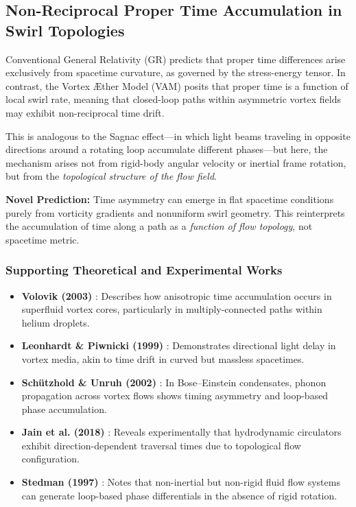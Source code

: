 \subsection{Non-Reciprocal Proper Time Accumulation in Swirl Topologies}

Conventional General Relativity (GR) predicts that proper time differences arise exclusively from spacetime curvature, as governed by the stress-energy tensor. In contrast, the Vortex Æther Model (VAM) posits that proper time is a function of local swirl rate, meaning that closed-loop paths within asymmetric vortex fields may exhibit non-reciprocal time drift.

This is analogous to the Sagnac effect---in which light beams traveling in opposite directions around a rotating loop accumulate different phases---but here, the mechanism arises not from rigid-body angular velocity or inertial frame rotation, but from the \emph{topological structure of the flow field}.

\textbf{Novel Prediction:} Time asymmetry can emerge in flat spacetime conditions purely from vorticity gradients and nonuniform swirl geometry. This reinterprets the accumulation of time along a path as a \emph{function of flow topology}, not spacetime metric.

\subsubsection{Supporting Theoretical and Experimental Works}

\begin{itemize}
    \item \textbf{Volovik (2003)} \cite{volovik2003}: Describes how anisotropic time accumulation occurs in superfluid vortex cores, particularly in multiply-connected paths within helium droplets.

    \item \textbf{Leonhardt \& Piwnicki (1999)} \cite{leonhardt1999}: Demonstrates directional light delay in vortex media, akin to time drift in curved but massless spacetimes.

    \item \textbf{Schützhold \& Unruh (2002)} \cite{schutzhold2002}: In Bose–Einstein condensates, phonon propagation across vortex flows shows timing asymmetry and loop-based phase accumulation.

    \item \textbf{Jain et al. (2018)} \cite{jain2018}: Reveals experimentally that hydrodynamic circulators exhibit direction-dependent traversal times due to topological flow configuration.

    \item \textbf{Stedman (1997)} \cite{stedman1997}: Notes that non-inertial but non-rigid fluid flow systems can generate loop-based phase differentials in the absence of rigid rotation.
\end{itemize}

